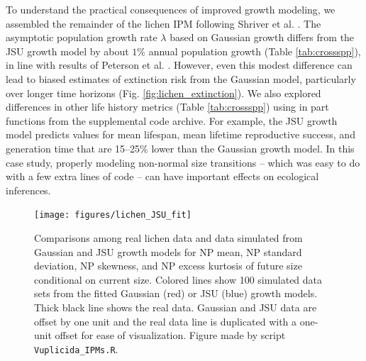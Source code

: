 \documentclass[12pt]{article}
\begin{document}
To understand the practical consequences of improved growth modeling, we assembled the remainder of the lichen IPM following Shriver et al. \citeyear{shriver2012comparative}. 
The asymptotic population growth rate $\lambda$ based on Gaussian growth differs from the JSU growth model by about $1\%$ annual population growth (Table \ref{tab:crossspp}), in line with results of Peterson et al. \citeyear{peterson2019improving}. 
However, even this modest difference can lead to biased estimates of extinction risk from the Gaussian model, particularly over longer time horizons (Fig. \ref{fig:lichen_extinction}). 
We also explored differences in other life history metrics (Table \ref{tab:crossspp}) using in part functions from the \cite{hernandez-etal-2024} supplemental code archive.
For example, the JSU growth model predicts values for mean lifespan, mean lifetime reproductive success, and generation time that are 15--25\% lower than the Gaussian growth model. 
In this case study, properly modeling non-normal size transitions -- which was easy to do with a few extra lines of code -- can have important effects on ecological inferences. 
\begin{figure}[tbp]
	\centering
	\texttt{[image: figures/lichen\_JSU\_fit]}
	\caption{Comparisons among real lichen data and data simulated from Gaussian and JSU growth models for NP mean, NP standard deviation, NP skewness, and NP excess kurtosis of future size conditional on current size. Colored lines show 100 simulated data sets from the fitted Gaussian (red) or JSU (blue) growth models. Thick black line shows the real data. Gaussian and JSU data are offset by one unit and the real data line is duplicated with a one-unit offset for ease of visualization. Figure made by script \texttt{Vuplicida\_IPMs.R}.}
	\label{fig:lichen_fit}
\end{figure} 
\end{document}
